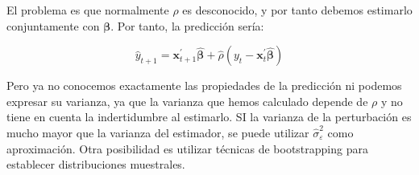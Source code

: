 El problema es que normalmente $\rho$ es desconocido, y por tanto
debemos estimarlo conjuntamente con $\boldsymbol{\beta}$. Por tanto,
la predicci\'on ser\'ia:

\[
\hat{y}_{t+1}=\boldsymbol{x}_{t+1}^{\prime}\hat{\boldsymbol{\beta}}+\hat{\rho}\left(y_{t}-\boldsymbol{x}_{t}^{\prime}\hat{\boldsymbol{\beta}}\right)
\]


Pero ya no conocemos exactamente las propiedades de la predicci\'on
ni podemos expresar su varianza, ya que la varianza que hemos calculado
depende de $\rho$ y no tiene en cuenta la indertidumbre al estimarlo.
SI la varianza de la perturbaci\'on es mucho mayor que la varianza del
estimador, se puede utilizar $\hat{\sigma}_{\varepsilon}^{2}$ como
aproximaci\'on. Otra posibilidad es utilizar t\'ecnicas de bootstrapping
para establecer distribuciones muestrales.
